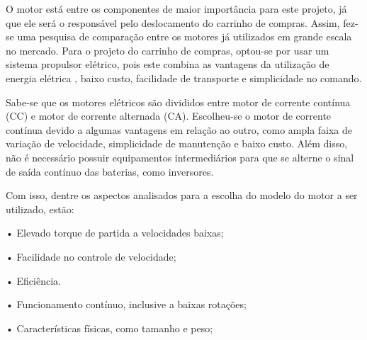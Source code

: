 \par O motor está entre os componentes de maior importância para este projeto, já que ele será o responsável pelo deslocamento do carrinho de compras. Assim, fez-se uma pesquisa	de comparação entre os motores já utilizados em grande escala no mercado.
Para o projeto do carrinho de compras, optou-se por usar um sistema propulsor elétrico, pois este combina as vantagens da utilização de energia elétrica	, baixo custo, facilidade de transporte e simplicidade no comando. \cite{maqel}
\par Sabe-se que os motores elétricos são divididos entre motor de corrente contínua (CC) e motor de corrente alternada (CA). Escolheu-se o motor de corrente contínua devido a algumas vantagens em relação ao outro, como ampla faixa de variação de velocidade, simplicidade de manutenção e baixo custo. Além disso, não é necessário possuir equipamentos intermediários para que se alterne o sinal de saída contínuo das baterias, como inversores.
\par Com isso, dentre os aspectos analisados para a escolha do modelo do motor a ser utilizado, estão:
\par•	Elevado torque de partida a velocidades baixas;
\par•	Facilidade no controle de velocidade;
\par•	Eficiência.
\par•	Funcionamento contínuo, inclusive a baixas rotações;
\par•	Características físicas, como tamanho e peso;

